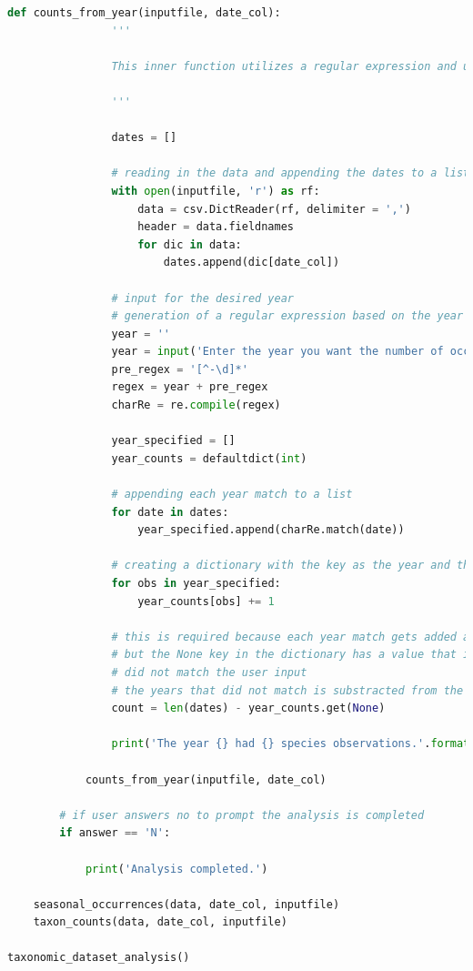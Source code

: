 \documentclass[letterpaper]{article}
\begin{document}
\begin{lstlisting}[language=Python]
            def counts_from_year(inputfile, date_col):
                '''
                
                This inner function utilizes a regular expression and user input to extract  occurrences from a user specified year and output the number of occurrences in total from that year. The regular expression searches the date column for all matches to the user's year.
                
                '''
                
                dates = []
                
                # reading in the data and appending the dates to a list
                with open(inputfile, 'r') as rf:
                    data = csv.DictReader(rf, delimiter = ',')
                    header = data.fieldnames
                    for dic in data:
                        dates.append(dic[date_col])
                
                # input for the desired year
                # generation of a regular expression based on the year input
                year = ''
                year = input('Enter the year you want the number of occurrences from: ')
                pre_regex = '[^-\d]*'
                regex = year + pre_regex
                charRe = re.compile(regex)

                year_specified = []
                year_counts = defaultdict(int)
                
                # appending each year match to a list
                for date in dates:
                    year_specified.append(charRe.match(date))
                
                # creating a dictionary with the key as the year and the value as the occurrences
                for obs in year_specified:
                    year_counts[obs] += 1

                # this is required because each year match gets added as a new key to the dictionary
                # but the None key in the dictionary has a value that is equal to every year that 
                # did not match the user input
                # the years that did not match is substracted from the total length of the dataset
                count = len(dates) - year_counts.get(None)

                print('The year {} had {} species observations.'.format(year, count))

            counts_from_year(inputfile, date_col)
        
        # if user answers no to prompt the analysis is completed
        if answer == 'N':
            
            print('Analysis completed.')
    
    seasonal_occurrences(data, date_col, inputfile)
    taxon_counts(data, date_col, inputfile)
    
taxonomic_dataset_analysis()

\end{lstlisting}
\end{document}
